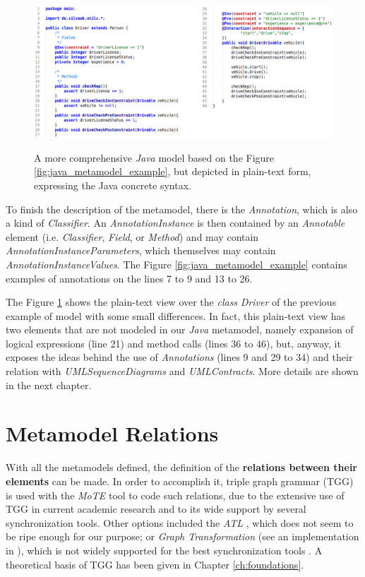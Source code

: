 \documentclass[tuberlin,cic,tc,english,noabntcite,oneside]{iiufrgs}
\begin{document}
\begin{figure}[H]
	\centering
    \caption{A more comprehensive \emph{Java} model based on the Figure \ref{fig:java_metamodel_example}, but depicted in plain-text form, expressing the Java concrete syntax.}
    \includegraphics[width=\textwidth]{javaMetamodelExample01_Text}
    \label{fig:java_metamodel_example_text01}
\end{figure}

To finish the description of the metamodel, there is the \emph{Annotation}, which is also a kind of \emph{Classifier}. An \emph{AnnotationInstance} is then contained by an \emph{Annotable} element (i.e. \emph{Classifier}, \emph{Field}, or \emph{Method}) and may contain \emph{AnnotationInstanceParameters}, which themselves may contain \emph{AnnotationInstanceValues}. The Figure \ref{fig:java_metamodel_example} contains examples of annotations on the lines 7 to 9 and 13 to 26.

The Figure \ref{fig:java_metamodel_example_text01} shows the plain-text view over the \emph{class} \emph{Driver} of the previous example of model with some small differences. In fact, this plain-text view has two elements that are not modeled in our \emph{Java} metamodel, namely expansion of logical expressions (line 21) and method calls (lines 36 to 46), but, anyway, it exposes the ideas behind the use of \emph{Annotations} (lines 9 and 29 to 34) and their relation with \emph{UMLSequenceDiagrams} and \emph{UMLContracts}. More details are shown in the next chapter.

\section{Metamodel Relations}
\label{subsec:MetamodelRelations}
With all the metamodels defined, the definition of the \textbf{relations between their elements} can be made. In order to accomplish it, triple graph grammar (TGG) is used with the \emph{MoTE} tool to code such relations, due to the extensive use of TGG in current academic research and to its wide support by several synchronization tools. Other options included the \emph{ATL} \citep{jouault2008atl}, which does not seem to be ripe enough for our purpose; or \emph{Graph Transformation} (see an implementation in \citealp{arendt2010henshin}), which is not widely supported for the best synchronization tools \citep{hildebrandt2013survey}. A theoretical basis of TGG has been given in Chapter \ref{ch:foundations}.
\end{document}
